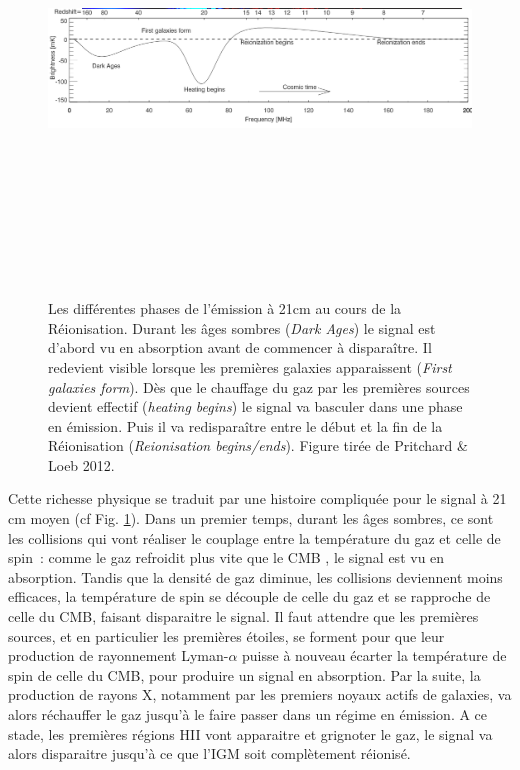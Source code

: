 \begin{figure}[htbp]
	\centering
		\includegraphics[height=12cm]{figs/21cm.png}
		\caption[L'histoire du signal à 21cm de la Réionisation]{Les différentes phases de l'émission à 21cm au cours de la Réionisation. Durant les âges sombres (\textit{Dark Ages}) le signal est d'abord vu en absorption avant de commencer à disparaître. Il redevient visible lorsque les premières galaxies apparaissent (\textit{First galaxies form}). Dès que le chauffage du gaz par les premières sources devient effectif (\textit{heating begins}) le signal va basculer dans une phase en émission. Puis il va redisparaître entre le début et la fin de la Réionisation (\textit{Reionisation begins/ends}). Figure tirée de Pritchard \& Loeb 2012.}
	\label{f:21cm}
\end{figure} 

Cette richesse physique se traduit par une histoire compliquée pour le signal à 21 cm moyen (cf Fig. \ref{f:21cm}). Dans un premier temps, durant les âges sombres, ce sont les collisions qui vont réaliser le couplage entre la température du gaz et celle de spin~: comme le gaz refroidit plus vite que le CMB , le signal est vu en absorption. Tandis que la densité de gaz diminue, les collisions deviennent moins efficaces, la température de spin se découple de celle du gaz et se rapproche de celle du CMB, faisant disparaitre le signal. Il faut attendre que les premières sources, et en particulier les premières étoiles, se forment pour que leur production de rayonnement Lyman-$\alpha$ puisse à nouveau écarter la température de spin de celle du CMB, pour produire un signal en absorption. Par la suite, la production de rayons X, notamment par les premiers noyaux actifs de galaxies, va alors réchauffer le gaz jusqu'à le faire passer dans un régime en émission. A ce stade, les premières régions HII vont apparaitre et grignoter le gaz, le signal va alors disparaitre jusqu'à ce que l'IGM soit complètement réionisé.

